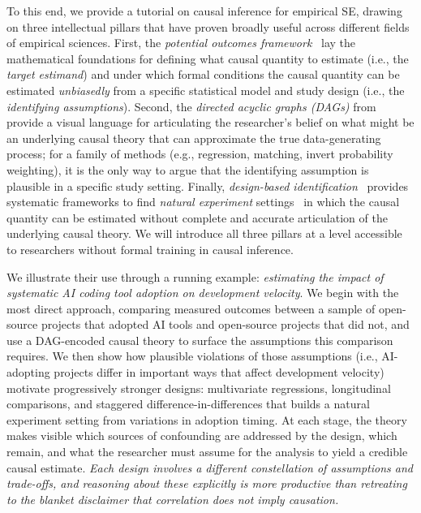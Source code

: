 To this end, we provide a tutorial on causal inference for empirical SE, drawing on three intellectual pillars that have proven broadly useful across different fields of empirical sciences.
First, the \emph{potential outcomes framework}~\cite{neyman1923application, rubin1974estimating} lay the mathematical foundations for defining what causal quantity to estimate (i.e., the \emph{target estimand}) and under which formal conditions the causal quantity can be estimated \emph{unbiasedly} from a specific statistical model and study design (i.e., the \emph{identifying assumptions}).
Second, the \emph{directed acyclic graphs (DAGs)} from \citet{pearl2009causality} provide a visual language for articulating the researcher's belief on what might be an underlying causal theory that can approximate the true data-generating process; for a family of methods (e.g., regression, matching, invert probability weighting), it is the only way to argue that the identifying assumption is plausible in a specific study setting.
Finally, \emph{design-based identification}~\cite{angrist2010credibility, cunningham2021causal} provides systematic frameworks to find \emph{natural experiment} settings~\cite{dunning2012natural} in which the causal quantity can be estimated without complete and accurate articulation of the underlying causal theory.
We will introduce all three pillars at a level accessible to researchers without formal training in causal inference.

We illustrate their use through a running example: \emph{estimating the impact of systematic AI coding tool adoption on development velocity}.
We begin with the most direct approach, comparing measured outcomes between a sample of open-source projects that adopted AI tools and open-source projects that did not, and use a DAG-encoded causal theory to surface the assumptions this comparison requires. 
We then show how plausible violations of those assumptions (i.e., AI-adopting projects differ in important ways that affect development velocity) motivate progressively stronger designs: multivariate regressions, longitudinal comparisons, and staggered difference-in-differences that builds a natural experiment setting from variations in adoption timing. 
At each stage, the theory makes visible which sources of confounding are addressed by the design, which remain, and what the researcher must assume for the analysis to yield a credible causal estimate. 
\emph{Each design involves a different constellation of assumptions and trade-offs, and reasoning about these explicitly is more productive than retreating to the blanket disclaimer that correlation does not imply causation.}

